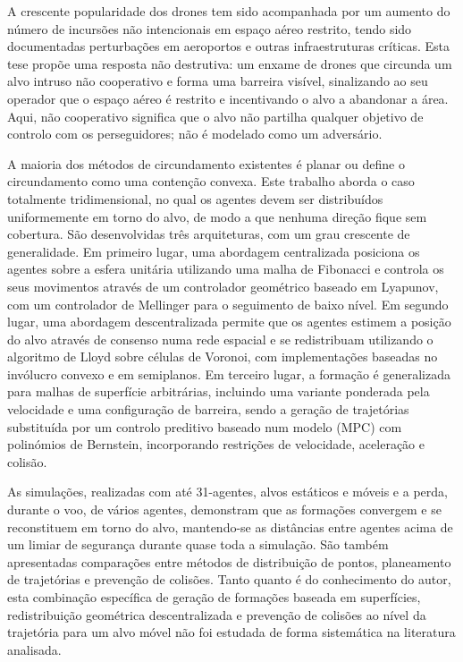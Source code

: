 %

\glsresetall

A crescente popularidade dos drones tem sido acompanhada por um aumento do número de incursões não intencionais em espaço aéreo restrito, tendo sido documentadas perturbações em aeroportos e outras infraestruturas críticas. Esta tese propõe uma resposta não destrutiva: um enxame de drones que circunda um alvo intruso não cooperativo e forma uma barreira visível, sinalizando ao seu operador que o espaço aéreo é restrito e incentivando o alvo a abandonar a área. Aqui, não cooperativo significa que o alvo não partilha qualquer objetivo de controlo com os perseguidores; não é modelado como um adversário.

A maioria dos métodos de circundamento existentes é planar ou define o circundamento como uma contenção convexa. Este trabalho aborda o caso totalmente tridimensional, no qual os agentes devem ser distribuídos uniformemente em torno do alvo, de modo a que nenhuma direção fique sem cobertura. São desenvolvidas três arquiteturas, com um grau crescente de generalidade. Em primeiro lugar, uma abordagem centralizada posiciona os agentes sobre a esfera unitária utilizando uma malha de Fibonacci e controla os seus movimentos através de um controlador geométrico baseado em Lyapunov, com um controlador de Mellinger para o seguimento de baixo nível. Em segundo lugar, uma abordagem descentralizada permite que os agentes estimem a posição do alvo através de consenso numa rede espacial e se redistribuam utilizando o algoritmo de Lloyd sobre células de Voronoi, com implementações baseadas no invólucro convexo e em semiplanos. Em terceiro lugar, a formação é generalizada para malhas de superfície arbitrárias, incluindo uma variante ponderada pela velocidade e uma configuração de barreira, sendo a geração de trajetórias substituída por um controlo preditivo baseado num modelo (MPC) com polinómios de Bernstein, incorporando restrições de velocidade, aceleração e colisão.

As simulações, realizadas com até 31-agentes, alvos estáticos e móveis e a perda, durante o voo, de vários agentes, demonstram que as formações convergem e se reconstituem em torno do alvo, mantendo-se as distâncias entre agentes acima de um limiar de segurança durante quase toda a simulação. São também apresentadas comparações entre métodos de distribuição de pontos, planeamento de trajetórias e prevenção de colisões. Tanto quanto é do conhecimento do autor, esta combinação específica de geração de formações baseada em superfícies, redistribuição geométrica descentralizada e prevenção de colisões ao nível da trajetória para um alvo móvel não foi estudada de forma sistemática na literatura analisada.

